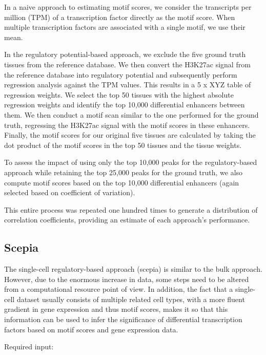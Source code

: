 In a naive approach to estimating motif scores, we consider the transcripts per million (TPM) of a transcription factor directly as the motif score. When multiple transcription factors are associated with a single motif, we use their mean.

In the regulatory potential-based approach, we exclude the five ground truth tissues from the reference database. We then convert the H3K27ac signal from the reference database into regulatory potential and subsequently perform regression analysis against the TPM values. This results in a 5 x XYZ table of regression weights. We select the top 50 tissues with the highest absolute regression weights and identify the top 10,000 differential enhancers between them. We then conduct a motif scan similar to the one performed for the ground truth, regressing the H3K27ac signal with the motif scores in these enhancers. Finally, the motif scores for our original five tissues are calculated by taking the dot product of the motif scores in the top 50 tissues and the tissue weights.

To assess the impact of using only the top 10,000 peaks for the regulatory-based approach while retaining the top 25,000 peaks for the ground truth, we also compute motif scores based on the top 10,000 differential enhancers (again selected based on coefficient of variation).

This entire process was repeated one hundred times to generate a distribution of correlation coefficients, providing an estimate of each approach's performance.

\subsection{Scepia}

The single-cell regulatory-based approach (scepia) is similar to the bulk approach. However, due to the enormous increase in data, some steps need to be altered from a computational resource point of view. In addition, the fact that a single-cell dataset usually consists of multiple related cell types, with a more fluent gradient in gene expression and thus motif scores, makes it so that this information can be used to infer the significance of differential transcription factors based on motif scores and gene expression data.

\noindent
Required input:

